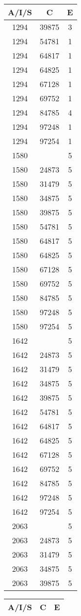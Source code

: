 {{\begin{tabular}{|c|c||c|}
        \hline
        \bf A/I/S & \bf C & \bf E \\
        \hline
1294&39875&3\\ 1294&54781&1\\ 1294&64817&1\\ 1294&64825&1\\ 1294&67128&1\\ 1294&69752&1\\ 1294&84785&4\\ 1294&97248&1\\ 1294&97254&1\\ 1580& &5\\ 1580&24873&5\\ 1580&31479&5\\ 1580&34875&5\\ 1580&39875&5\\ 1580&54781&5\\ 1580&64817&5\\ 1580&64825&5\\ 1580&67128&5\\ 1580&69752&5\\ 1580&84785&5\\ 1580&97248&5\\ 1580&97254&5\\ 1642& &5\\ 1642&24873&5\\ 1642&31479&5\\ 1642&34875&5\\ 1642&39875&5\\ 1642&54781&5\\ 1642&64817&5\\ 1642&64825&5\\ 1642&67128&5\\ 1642&69752&5\\ 1642&84785&5\\ 1642&97248&5\\ 1642&97254&5\\ 2063& &5\\ 2063&24873&5\\ 2063&31479&5\\ 2063&34875&5\\ 2063&39875&5\\ 
        \hline
        \end{tabular}
        \quad
        \begin{tabular}{|c|c||c|}
        \hline
        \bf A/I/S & \bf C & \bf E \\
        \hline

\end{tabular}}}
